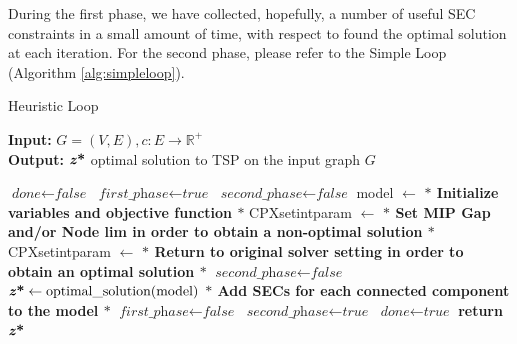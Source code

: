 During the first phase, we have collected, hopefully, a number of useful SEC constraints in a small amount of time, with respect to found the optimal solution at each iteration.
For the second phase, please refer to the Simple Loop (Algorithm \ref{alg:simpleloop}).
\begin{algorithm}
    \caption{Heuristic Loop}\label{Loop Method}
    \hspace*{\algorithmicindent} \textbf{Input:} $G = (V,E) , c : E \rightarrow \mathbb{R}^+$\\
    \hspace*{\algorithmicindent} \textbf{Output:} $\textbf{\textit{z}\text{*}} $ optimal solution to TSP on the input graph $G$
    \begin{algorithmic}[1]
    \State $\textit{done} \gets \textit{false}$
    \State $\textit{first\_phase} \gets \textit{true}$
    \State $\textit{second\_phase} \gets \textit{false}$
    \State model $ \leftarrow $ \textbf{$\ast$ Initialize variables and objective function $\ast$ }
    \State CPXsetintparam $ \leftarrow $ \textbf{$\ast$ Set MIP Gap and/or Node lim in order to obtain a non-optimal solution $\ast$ }
	\State CPXsetintparam $ \leftarrow $\textbf{ $\ast$ Return to original solver setting in order to obtain an optimal solution $\ast$ }
	\State $\textit{second\_phase} \gets \textit{false}$
	\EndIf
    	\State $\textbf{\textit{z}\text{*}}  \gets \text{optimal\_solution}(\text{model})$\;
	\State \textbf{ $\ast$ Add SECs for each connected component to the model $\ast$ }
	\EndIf
	\State $\textit{first\_phase} \gets \textit{false}$
	\State $\textit{second\_phase} \gets \textit{true}$
	\EndIf
	\State $\textit{done} \gets \textit{true}$
	\EndIf
    \EndWhile
    \State \textbf{return} $\textbf{\textit{z}\text{*}} $
    \end{algorithmic}
    \label{alg:heuloop}
    \end{algorithm}
    
\newpage
